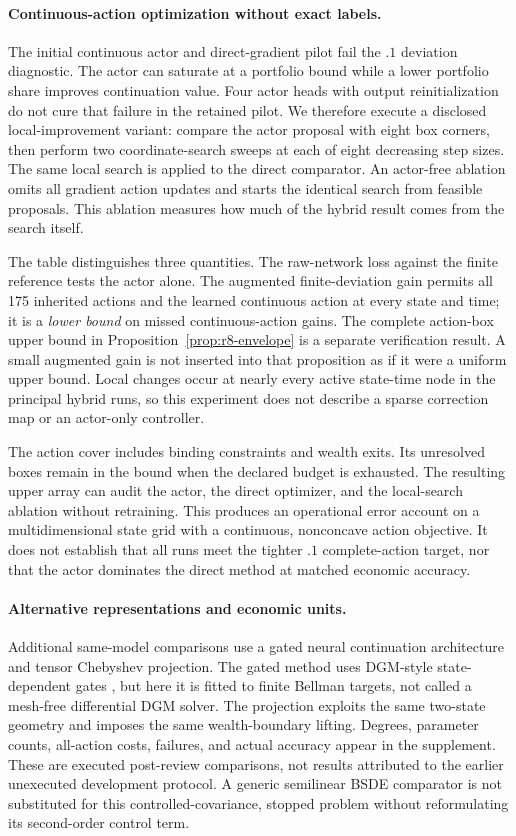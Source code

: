 \paragraph*{Continuous-action optimization without exact labels.}
The initial continuous actor and direct-gradient pilot fail the $.1$ deviation diagnostic. The actor can saturate at a portfolio bound while a lower portfolio share improves continuation value. Four actor heads with output reinitialization do not cure that failure in the retained pilot. We therefore execute a disclosed local-improvement variant: compare the actor proposal with eight box corners, then perform two coordinate-search sweeps at each of eight decreasing step sizes. The same local search is applied to the direct comparator. An actor-free ablation omits all gradient action updates and starts the identical search from feasible proposals. This ablation measures how much of the hybrid result comes from the search itself.

The table distinguishes three quantities. The raw-network loss against the finite reference tests the actor alone. The augmented finite-deviation gain permits all 175 inherited actions and the learned continuous action at every state and time; it is a \emph{lower bound} on missed continuous-action gains. The complete action-box upper bound in Proposition~\ref{prop:r8-envelope} is a separate verification result. A small augmented gain is not inserted into that proposition as if it were a uniform upper bound. Local changes occur at nearly every active state-time node in the principal hybrid runs, so this experiment does not describe a sparse correction map or an actor-only controller.

The action cover includes binding constraints and wealth exits. Its unresolved boxes remain in the bound when the declared budget is exhausted. The resulting upper array can audit the actor, the direct optimizer, and the local-search ablation without retraining. This produces an operational error account on a multidimensional state grid with a continuous, nonconcave action objective. It does not establish that all runs meet the tighter $.1$ complete-action target, nor that the actor dominates the direct method at matched economic accuracy.

\paragraph*{Alternative representations and economic units.}
Additional same-model comparisons use a gated neural continuation architecture and tensor Chebyshev projection. The gated method uses DGM-style state-dependent gates \citep{sirignano2018}, but here it is fitted to finite Bellman targets, not called a mesh-free differential DGM solver. The projection exploits the same two-state geometry and imposes the same wealth-boundary lifting. Degrees, parameter counts, all-action costs, failures, and actual accuracy appear in the supplement. These are executed post-review comparisons, not results attributed to the earlier unexecuted development protocol. A generic semilinear BSDE comparator is not substituted for this controlled-covariance, stopped problem without reformulating its second-order control term.

